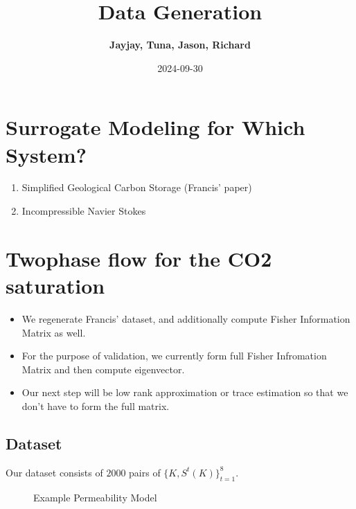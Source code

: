 \documentclass[
]{article}
\title{Data Generation}
\author{\textbf{Jayjay, Tuna, Jason, Richard}\\}
\date{2024-09-30}
\providecommand{\tightlist}{%
  \setlength{\itemsep}{0pt}\setlength{\parskip}{0pt}}\usepackage{longtable,booktabs,array}
\begin{document}
\maketitle


\section{Surrogate Modeling for Which
System?}\label{surrogate-modeling-for-which-system}

\begin{enumerate}
\def\labelenumi{\arabic{enumi}.}
\tightlist
\item
  Simplified Geological Carbon Storage (Francis' paper)
\item
  Incompressible Navier Stokes
\end{enumerate}

\section{Twophase flow for the CO2
saturation}\label{twophase-flow-for-the-co2-saturation}

\begin{itemize}
\tightlist
\item
  We regenerate Francis' dataset, and additionally compute Fisher
  Information Matrix as well.
\item
  For the purpose of validation, we currently form full Fisher
  Infromation Matrix and then compute eigenvector.
\item
  Our next step will be low rank approximation or trace estimation so
  that we don't have to form the full matrix.
\end{itemize}

\subsection{Dataset}\label{dataset}

Our dataset consists of \(2000\) pairs of \(\{K, S^t(K)\}_{t=1}^8\).

\begin{figure}

\begin{minipage}{0.50\linewidth}



\end{minipage}%
%
\begin{minipage}{0.50\linewidth}



\end{minipage}%

\caption{\label{fig-K}Example Permeability Model}

\end{figure}%
\end{document}
